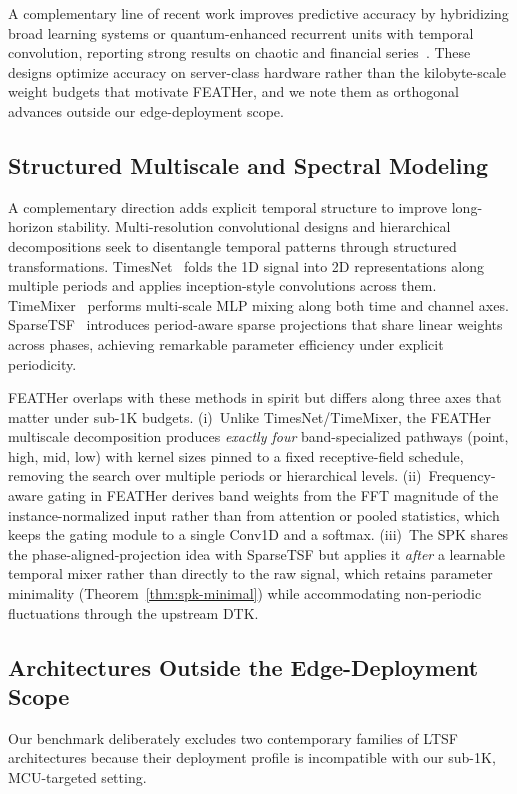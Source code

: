 \documentclass[journal]{IEEEtran}
\theoremstyle{remark}
\begin{document}
A complementary line of recent work improves predictive accuracy by
hybridizing broad learning systems or quantum-enhanced recurrent units
with temporal convolution, reporting strong results on chaotic and
financial series~\cite{Su2026BLSAttnTCN, Su2025BLSQLSTM}. These designs
optimize accuracy on server-class hardware rather than the
kilobyte-scale weight budgets that motivate FEATHer, and we note them
as orthogonal advances outside our edge-deployment scope.

\subsection{Structured Multiscale and Spectral Modeling}
A complementary direction adds explicit temporal structure to improve
long-horizon stability. Multi-resolution convolutional designs and
hierarchical decompositions seek to disentangle temporal patterns
through structured transformations. TimesNet~\cite{Wu2023TimesNet}
folds the 1D signal into 2D representations along multiple periods and
applies inception-style convolutions across them.
TimeMixer~\cite{Wang2024TimeMixer} performs multi-scale MLP mixing
along both time and channel axes.
SparseTSF~\cite{Lin2024SparseTSF} introduces period-aware sparse
projections that share linear weights across phases, achieving
remarkable parameter efficiency under explicit periodicity.

FEATHer overlaps with these methods in spirit but differs along three
axes that matter under sub-1K budgets. (i)~Unlike
TimesNet/TimeMixer, the FEATHer multiscale decomposition produces
\emph{exactly four} band-specialized pathways (point, high, mid, low)
with kernel sizes pinned to a fixed receptive-field schedule, removing
the search over multiple periods or hierarchical levels.
(ii)~Frequency-aware gating in FEATHer derives band weights from the
FFT magnitude of the instance-normalized input rather than from
attention or pooled statistics, which keeps the gating module to a
single Conv1D and a softmax. (iii)~The SPK shares the
phase-aligned-projection idea with SparseTSF but applies it
\emph{after} a learnable temporal mixer rather than directly to the
raw signal, which retains parameter minimality
(Theorem~\ref{thm:spk-minimal}) while accommodating non-periodic
fluctuations through the upstream DTK.

\subsection{Architectures Outside the Edge-Deployment Scope}
\label{subsec:scope-exclusion}
Our benchmark deliberately excludes two contemporary families of
LTSF architectures because their deployment profile is incompatible
with our sub-1K, MCU-targeted setting.
\end{document}
